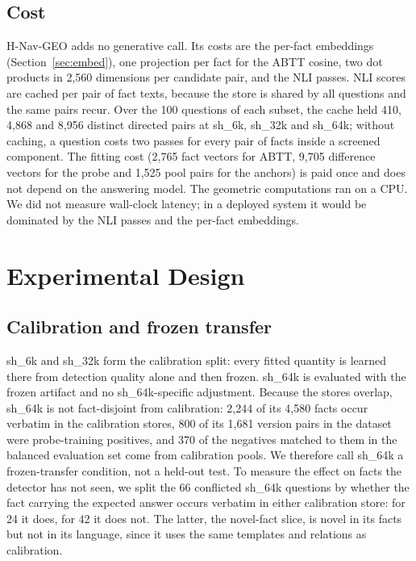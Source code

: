 \documentclass{CUP-JNL-NLP}
\newcommand{\sub}[1]{\textsf{sh\_#1}}                    %
\newcommand{\geo}{H-Nav-GEO}
\begin{document}
\subsection{Cost}
\label{sec:costmethod}

\geo{} adds no generative call. Its costs are the per-fact embeddings (Section~\ref{sec:embed}), one projection per fact for the ABTT cosine, two dot products in 2,560 dimensions per candidate pair, and the NLI passes. NLI scores are cached per pair of fact texts, because the store is shared by all questions and the same pairs recur. Over the 100 questions of each subset, the cache held 410, 4,868 and 8,956 distinct directed pairs at \sub{6k}, \sub{32k} and \sub{64k}; without caching, a question costs two passes for every pair of facts inside a screened component. The fitting cost (2,765 fact vectors for ABTT, 9,705 difference vectors for the probe and 1,525 pool pairs for the anchors) is paid once and does not depend on the answering model. The geometric computations ran on a CPU. We did not measure wall-clock latency; in a deployed system it would be dominated by the NLI passes and the per-fact embeddings.

\section{Experimental Design}
\label{sec:design}

\subsection{Calibration and frozen transfer}
\label{sec:splits}

\sub{6k} and \sub{32k} form the calibration split: every fitted quantity is learned there from detection quality alone and then frozen. \sub{64k} is evaluated with the frozen artifact and no \sub{64k}-specific adjustment. Because the stores overlap, \sub{64k} is not fact-disjoint from calibration: 2,244 of its 4,580 facts occur verbatim in the calibration stores, 800 of its 1,681 version pairs in the dataset were probe-training positives, and 370 of the negatives matched to them in the balanced evaluation set come from calibration pools. We therefore call \sub{64k} a frozen-transfer condition, not a held-out test. To measure the effect on facts the detector has not seen, we split the 66 conflicted \sub{64k} questions by whether the fact carrying the expected answer occurs verbatim in either calibration store: for 24 it does, for 42 it does not. The latter, the novel-fact slice, is novel in its facts but not in its language, since it uses the same templates and relations as calibration.
\end{document}

